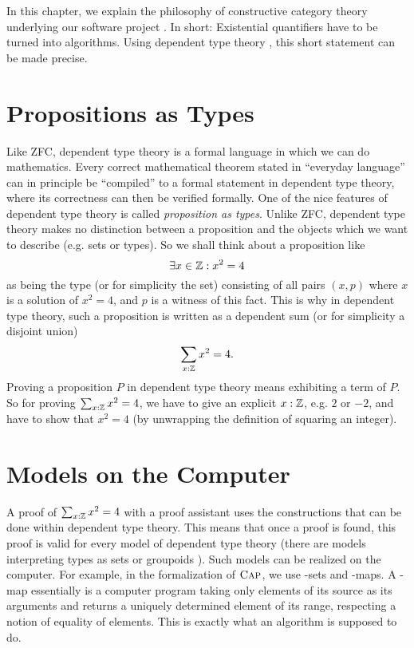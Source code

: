 In this chapter, we explain the philosophy of constructive category theory 
underlying our software project \CapPkg.
In short: Existential quantifiers have to be turned into algorithms.
Using dependent type theory \cite{hottbook}, this short statement can be made precise.

\section{Propositions as Types}
Like ZFC, dependent type theory is a formal language in which we can do mathematics.
Every correct mathematical theorem stated in ``everyday language'' can in principle be
``compiled'' to a formal statement in dependent type theory, where its correctness
can then be verified formally.
One of the nice features of dependent type theory is called \textit{proposition as types}.
Unlike ZFC, dependent type theory makes no distinction between a proposition and
the objects which we want to describe (e.g. sets or types). So we shall think about
a proposition like
\[
 \exists x \in \mathbb{Z}: x^2 = 4
\]
as being the type (or for simplicity the set) consisting of all pairs $(x, p)$ where
$x$ is a solution of $x^2 = 4$, and $p$ is a witness
of this fact. This is why in dependent type theory, such a proposition
is written as a dependent sum (or for simplicity a disjoint union)
\[
\sum_{x: \mathbb{Z}} x^2 = 4.
\]
Proving a proposition $P$ in dependent type theory means exhibiting a term of $P$.
So for proving $\sum_{x: \mathbb{Z}} x^2 = 4$, we have to give an explicit $x:\mathbb{Z}$, e.g. $2$ or $-2$,
and have to show that $x^2 = 4$ (by unwrapping the definition of squaring an integer).

\section{Models on the Computer}

A proof of $\sum_{x: \mathbb{Z}} x^2 = 4$ with a proof assistant uses the constructions
that can be done within dependent type theory. This means that once a proof is found,
this proof is valid for every model of dependent type theory
(there are models interpreting types as sets or groupoids \cite{Hofmann96thegroupoid}).
Such models can be realized on the computer. For example, in the formalization 
of $\textsc{Cap}$, we use \GAP-sets and \GAP-maps. A \GAP-map essentially is a
computer program taking only elements of its source as its arguments
and returns a uniquely determined element of its range, respecting a notion of 
equality of elements. This is exactly what an algorithm is supposed to do.

